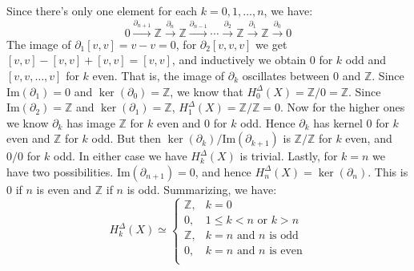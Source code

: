 \documentclass{article}                                                        %
\begin{document}
    \begin{solution}
        Since there's only one element for each $k=0,1,\dots,n$, we have:
        \begin{equation}
            0\overset{\partial_{n+1}}{\longrightarrow}\mathbb{Z}
            \overset{\partial_{n}}{\longrightarrow}\mathbb{Z}
            \overset{\partial_{n-1}}{\longrightarrow}
            \cdots
            \overset{\partial_{2}}{\longrightarrow}\mathbb{Z}
            \overset{\partial_{1}}{\longrightarrow}\mathbb{Z}
            \overset{\partial_{0}}{\longrightarrow}0
        \end{equation}
        The image of $\partial_{1}[v,v]=v-v=0$, for $\partial_{2}[v,v,v]$ we get
        $[v,v]-[v,v]+[v,v]=[v,v]$, and inductively we obtain $0$ for $k$ odd and
        $[v,v,\dots,v]$ for $k$ even. That is, the image of $\partial_{k}$
        oscillates between $0$ and $\mathbb{Z}$. Since $\textrm{Im}(\partial_{1})=0$
        and $\ker(\partial_{0})=\mathbb{Z}$, we know that
        $H_{0}^{\Delta}(X)=\mathbb{Z}/0=\mathbb{Z}$. Since
        $\textrm{Im}(\partial_{2})=\mathbb{Z}$ and $\ker(\partial_{1})=\mathbb{Z}$,
        $H_{1}^{\Delta}(X)=\mathbb{Z}/\mathbb{Z}=0$. Now for the higher ones we
        know $\partial_{k}$ has image $\mathbb{Z}$ for $k$ even and $0$ for $k$
        odd. Hence $\partial_{k}$ has kernel $0$ for $k$ even and $\mathbb{Z}$
        for $k$ odd. But then $\ker(\partial_{k})/\textrm{Im}(\partial_{k+1})$
        is $\mathbb{Z}/\mathbb{Z}$ for $k$ even, and $0/0$ for $k$ odd. In
        either case we have $H_{k}^{\Delta}(X)$ is trivial. Lastly, for $k=n$
        we have two possibilities.  $\textrm{Im}(\partial_{n+1})=0$, and hence
        $H_{n}^{\Delta}(X)=\ker(\partial_{n})$. This is $0$ if $n$ is even and
        $\mathbb{Z}$ if $n$ is odd. Summarizing, we have:
        \begin{equation}
            H_{k}^{\Delta}(X)\simeq
            \begin{cases}
                \mathbb{Z},&k=0\\
                0,&1\leq{k}<n\text{ or }k>n\\
                \mathbb{Z},&k=n\text{ and }n\text{ is odd}\\
                0,&k=n\text{ and }n\text{ is even}\\
            \end{cases}
        \end{equation}
    \end{solution}
\end{document}
